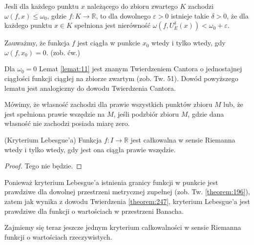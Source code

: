 \documentclass[leqno]{article}
\begin{document}
\begin{justify}
\begin{lemat}
{
    Jesli dla każdego punktu $x$ należącego do zbioru zwartego $K$ zachodzi $\omega(f,x) \leqslant \omega_0$, gdzie $f : K \to \mathbb{R}$, to dla 
    dowolnego $\varepsilon > 0$ istnieje takie $\delta > 0$, że dla każdego punktu $x \in K$ spełniona jest nierówność $\omega(f,  U_E^\delta(x)) < \omega_0 + \varepsilon$.
}
\end{lemat}

\begin{uwaga}
    Zauważmy, że funkcja $f$ jest ciągła w punkcie $x_0$ wtedy i tylko wtedy, gdy $\omega(f, x_0) = 0$. (zob. ćw.)
\end{uwaga}

Dla $\omega_0 = 0$ Lemat \ref{lemat:11} jest znanym Twierdzeniem Cantora o jednostajnej ciągłości funkcji ciągłej na zbiorze zwartym (zob. Tw. 51). Dowód
powyższego lematu jest analogiczny do dowodu Twierdzenia Cantora.


\begin{defn}
    Mówimy, że własność zachodzi dla prawie wszystkich punktów zbioru $M$ lub, że jest spełniona prawie wszędzie na $M$, jeśli podzbiór zbioru $M$, gdzie dana własność nie 
    zachodzi posiada miarę zero.
\end{defn}

\begin{theorem}
{
    (Kryterium Lebesgue'a) Funkcja $f : I \to \mathbb{R}$ jest całkowalna w sensie Riemanna wtedy i tylko wtedy, gdy jest ona ciągła prawie wszędzie.
}
\end{theorem}

\begin{proof}
    Tego nie będzie.
\end{proof}

\begin{uwaga}
    Ponieważ kryterium Lebesgue'a istnienia granicy funkcji w punkcie jest prawdziwe dla dowolnej przestrzeni metrycznej zupełnej (zob. Tw. \ref{theorem:196}),
    zatem jak wynika z dowodu Twierdzenia \ref{theorem:247}, kryterium Lebesgue'a jest prawdziwe dla funkcji o wartościach w przestrzeni Banacha.
\end{uwaga}

Zajmiemy się teraz jeszcze jednym kryterium całkowalności w sensie Riemanna funkcji o wartościach rzeczywistych.


\end{justify}
\end{document}
